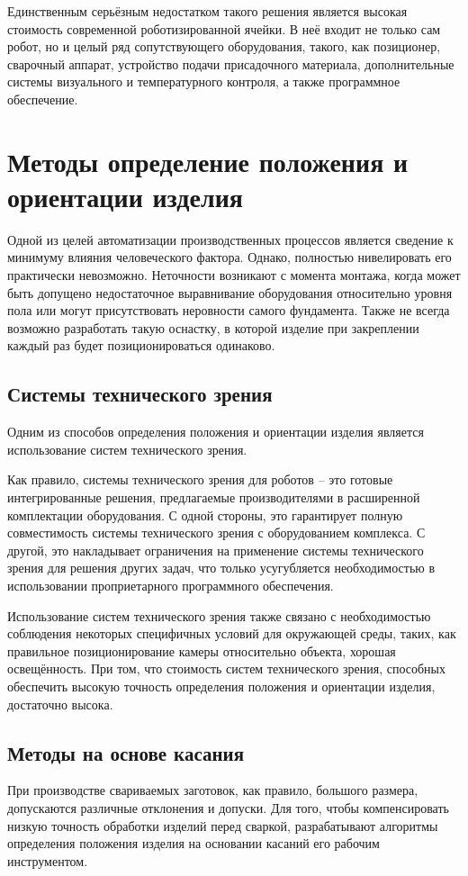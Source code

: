 Единственным серьёзным недостатком такого решения является высокая стоимость современной роботизированной ячейки.
В неё входит не только сам робот, но и целый ряд сопутствующего оборудования, такого, как позиционер, сварочный аппарат, устройство подачи присадочного материала, дополнительные системы визуального и температурного контроля, а также программное обеспечение.


\section{Методы определение положения и ориентации изделия}
Одной из целей автоматизации производственных процессов является сведение к минимуму влияния человеческого фактора.
Однако, полностью нивелировать его практически невозможно.
Неточности возникают с момента монтажа, когда может быть допущено недостаточное выравнивание оборудования относительно уровня пола или могут присутствовать неровности самого фундамента.
Также не всегда возможно разработать такую оснастку, в которой изделие при закреплении каждый раз будет позиционироваться одинаково.

\subsection{Системы технического зрения}
Одним из способов определения положения и ориентации изделия является использование систем технического зрения.

Как правило, системы технического зрения для роботов -- это готовые интегрированные решения, предлагаемые производителями в расширенной комплектации оборудования.
С одной стороны, это гарантирует полную совместимость системы технического зрения с оборудованием комплекса.
С другой, это накладывает ограничения на применение системы технического зрения для решения других задач, что только усугубляется необходимостью в использовании проприетарного программного обеспечения.

Использование систем технического зрения также связано с необходимостью соблюдения некоторых специфичных условий для окружающей среды, таких, как правильное позиционирование камеры относительно объекта, хорошая освещённость.
При том, что стоимость систем технического зрения, способных обеспечить высокую точность определения положения и ориентации изделия, достаточно высока.

\subsection{Методы на основе касания}
При производстве свариваемых заготовок, как правило, большого размера, допускаются различные отклонения и допуски.
Для того, чтобы компенсировать низкую точность обработки изделий перед сваркой, разрабатывают алгоритмы определения положения изделия на основании касаний его рабочим инструментом.

